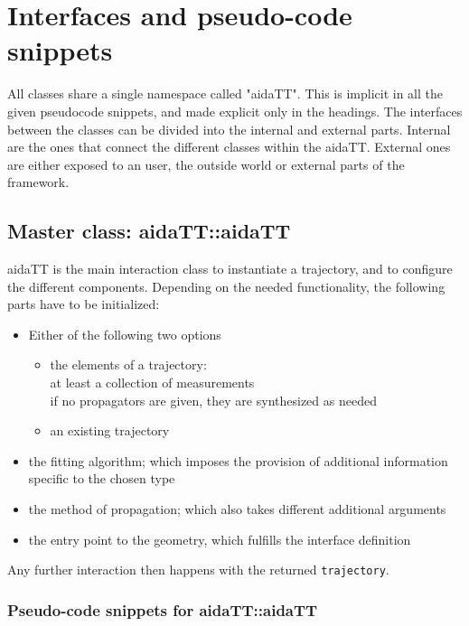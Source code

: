 \documentclass[12pt]{article}
\begin{document}


\section{Interfaces and pseudo-code snippets}
All classes share a single namespace called "aidaTT".
This is implicit in all the given pseudocode snippets, and made explicit only in the headings.
The interfaces between the classes can be divided into the internal and external parts.
Internal are the ones that connect the different classes within the aidaTT.
External ones are either exposed to an user, the outside world or external parts of the framework.

\subsection{Master class: aidaTT::aidaTT}
aidaTT is the main interaction class to instantiate a trajectory, and to configure the different components.
Depending on the needed functionality, the following parts have to be initialized:
\begin{itemize}
    \item Either of the following two options
        \begin{itemize}
            \item the elements of a trajectory: \\at least a collection of measurements\\ if no propagators are given, they are synthesized as needed
            \item an existing trajectory
        \end{itemize}
    \item the fitting algorithm; which imposes the provision of additional information specific to the chosen type
    \item the method of propagation; which also takes different additional arguments
    \item the entry point to the geometry, which fulfills the interface definition
\end{itemize}
Any further interaction then happens with the returned {\tt trajectory}.

\subsubsection{Pseudo-code snippets for aidaTT::aidaTT}
\end{document}
